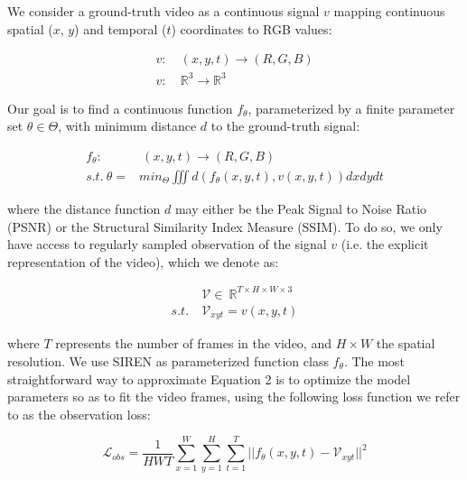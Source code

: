 \documentclass{article}
\begin{document}
We consider a ground-truth video as a continuous signal $v$ mapping continuous spatial ($x$, $y$) and temporal ($t$) coordinates to RGB values:

\begin{equation}
\begin{aligned}
v:& \: (x, y, t) \rightarrow (R, G, B) \\
v:& \: \mathbb{R}^3 \rightarrow \mathbb{R}^3
\end{aligned}
\end{equation}

Our goal is to find a continuous function $f_{\theta}$, parameterized by a finite parameter set $\theta \in \Theta$,
with minimum distance $d$ to the ground-truth signal:

\begin{equation}
\begin{aligned}
f_{\theta}:& \:(x, y, t) \rightarrow (R, G, B) \\
s.t. \: \theta =& min_{\Theta} \iiint d(f_{\theta}(x,y,t), v(x,y,t)) dx dy dt
\end{aligned}
\end{equation}

where the distance function $d$ may either be the Peak Signal to Noise Ratio (PSNR) or the Structural Similarity Index Measure (SSIM).
To do so, we only have access to regularly sampled observation of the signal $v$
(i.e. the explicit representation of the video), which we denote as:

\begin{equation}
\begin{aligned}
&\mathcal{V} \in  \: \mathbb{R}^{T \times H \times W \times 3} \\
s.t. \: &\mathcal{V}_{xyt} =   v(x, y, t) %
\end{aligned}
\end{equation}

where $T$ represents the number of frames in the video, and $H \times W$ the spatial resolution.
We use SIREN as parameterized function class $f_{\theta}$.
The most straightforward way to approximate Equation 2 is to optimize the model parameters so as to fit the video frames,
using the following loss function we refer to as the observation loss:

\begin{equation}
\mathcal{L}_{obs} = \frac{1}{HWT} \sum_{x=1}^W\sum_{y=1}^H\sum_{t=1}^T || f_{\theta}(x,y,t) - \mathcal{V}_{xyt} ||^2
\end{equation}
\end{document}

